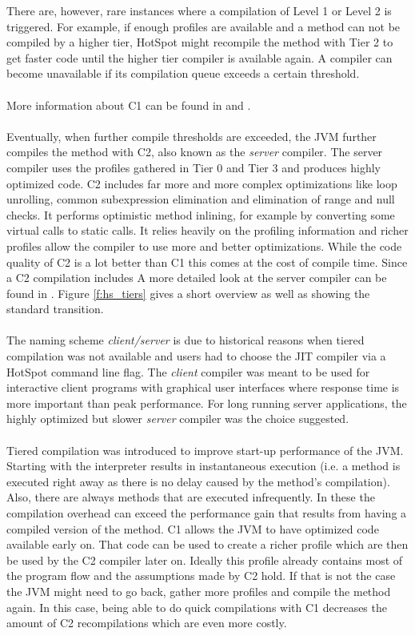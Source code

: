 There are, however, rare instances where a compilation of Level 1 or Level 2 is triggered. For example, if enough profiles are available and a method can not be compiled by a higher tier, HotSpot might recompile the method with Tier 2 to get faster code until the higher tier compiler is available again. A compiler can become unavailable if its compilation queue exceeds a certain threshold.
\\\\
More information about C1 can be found in \cite{client_compiler_talk} and \cite{client_compiler}.
\\\\
Eventually, when further compile thresholds are exceeded, the JVM further compiles the method with C2, also known as the \textit{server} compiler.
The server compiler uses the profiles gathered in Tier 0 and Tier 3 and produces highly optimized code. C2 includes far more and more complex optimizations like loop unrolling, common subexpression elimination and elimination of range and null checks. It performs optimistic method inlining, for example by converting some virtual calls to static calls. It relies heavily on the profiling information and richer profiles allow the compiler to use more and better optimizations.
While the code quality of C2 is a lot better than C1 this comes at the cost of compile time. Since a C2 compilation includes 
A more detailed look at the server compiler can be found in \cite{server_compiler}.
Figure \ref{f:hs_tiers} gives a short overview as well as showing the standard transition.
\\\\
The naming scheme \textit{client/server} is due to historical reasons when tiered compilation was not available and users had to choose the JIT compiler via a HotSpot command line flag. The \textit{client} compiler was meant to be used for interactive client programs with graphical user interfaces where response time is more important than peak performance. For long running server applications, the highly optimized but slower \textit{server} compiler was the choice suggested. 
\\\\
Tiered compilation was introduced to improve start-up performance of the JVM.
Starting with the interpreter results in instantaneous execution (i.e. a method is executed right away as there is no delay caused by the method's compilation). Also, there are always methods that are executed infrequently. In these the compilation overhead can exceed the performance gain that results from having a compiled version of the method. C1 allows the JVM to have optimized code available early on. That code can be used to create a richer profile which are then be used by the C2 compiler later on. Ideally this profile already contains most of the program flow and the assumptions made by C2 hold. If that is not the case the JVM might need to go back, gather more profiles and compile the method again. In this case, being able to do quick compilations with C1 decreases the amount of C2 recompilations which are even more costly.

